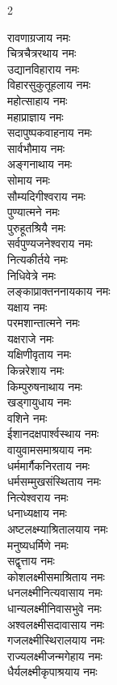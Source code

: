 \begin{multicols}{2}
\begin{flushleft}
रावणाग्रजाय नमः\hfill{}\\ %
चित्रचैत्ररथाय नमः\\
उद्यानविहाराय नमः\\
विहारसुकुतूहलाय नमः\\
महोत्साहाय नमः\\
महाप्राज्ञाय नमः\\
सदापुष्पकवाहनाय नमः\\
सार्वभौमाय नमः\\
अङ्गनाथाय नमः\\
सोमाय नमः\\
सौम्यदिगीश्वराय नमः\hfill{}\\ %
पुण्यात्मने नमः\\
पुरुहूतश्रियै नमः\\
सर्वपुण्यजनेश्वराय नमः\\
नित्यकीर्तये नमः\\
निधिवेत्रे नमः\\
लङ्काप्राक्तननायकाय नमः\\
यक्षाय नमः\\
परमशान्तात्मने नमः\\
यक्षराजे नमः\\
यक्षिणीवृताय नमः\hfill{}\\ %
किन्नरेशाय नमः\\
किम्पुरुषनाथाय नमः\\
खड्गायुधाय नमः\\
वशिने नमः\\
ईशानदक्षपार्श्वस्थाय नमः\\
वायुवामसमाश्रयाय नमः\\
धर्ममार्गैकनिरताय नमः\\
धर्मसम्मुखसंस्थिताय नमः\\
नित्येश्वराय नमः\\
धनाध्यक्षाय नमः\hfill{}\\ %
अष्टलक्ष्म्याश्रितालयाय नमः\\
मनुष्यधर्मिणे नमः\\
सद्वृत्ताय नमः\\
कोशलक्ष्मीसमाश्रिताय नमः\\
धनलक्ष्मीनित्यवासाय नमः\\
धान्यलक्ष्मीनिवासभुवे नमः\\
अश्वलक्ष्मीसदावासाय नमः\\
गजलक्ष्मीस्थिरालयाय नमः\\
राज्यलक्ष्मीजन्मगेहाय नमः\\
धैर्यलक्ष्मीकृपाश्रयाय नमः\hfill{}\\ %

\end{flushleft}
\end{multicols}
